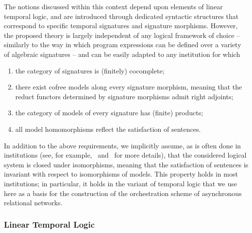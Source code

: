 \documentclass{LMCS}
\begin{document}
The notions discussed within this context depend upon elements of linear temporal logic, and are introduced through dedicated syntactic structures that correspond to specific temporal signatures and signature morphisms.
However, the proposed theory is largely independent of any logical framework of choice -- similarly to the way in which program expressions can be defined over a variety of algebraic signatures -- and can be easily adapted to any institution for which
\begin{enumerate}

\item\label{assumption:ARN-first} the category of signatures is (finitely) cocomplete;

\item there exist cofree models along every signature morphism, meaning that the reduct functors determined by signature morphisms admit right adjoints;

\item the category of models of every signature has (finite) products;

\item\label{assumption:ARN-last} all model homomorphisms reflect the satisfaction of sentences.

\end{enumerate}

In addition to the above requirements, we implicitly assume, as is often done in institutions (see, for example,~\cite{Diaconescu:Institution-Independent-Model-Theory-2008} and~\cite{Sannella-Tarlecki:Foundations-of-Algebraic-Specification-2011} for more details), that the considered logical system is closed under isomorphisms, meaning that the satisfaction of sentences is invariant with respect to isomorphisms of models.  This property holds in most institutions; in particular, it holds in the variant of temporal logic that we use here as a basis for the construction of the orchestration scheme of asynchronous relational networks.


\subsubsection*{Linear Temporal Logic}
\end{document}
